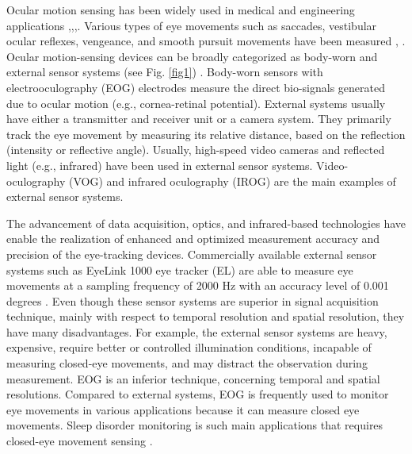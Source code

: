 \documentclass[transmag]{IEEEtran}
\begin{document}
Ocular motion sensing has been widely used in medical and engineering applications \cite{ref23},\cite{ref30},\cite{ref29},\cite{ref32}. Various types of eye movements such as saccades, vestibular ocular reflexes, vengeance, and smooth pursuit movements have been measured \cite{ref1}, \cite{ref25}. Ocular motion-sensing devices can be broadly categorized as body-worn and external sensor systems (see Fig. \ref{fig1}) \cite{ref2}. Body-worn sensors with electrooculography (EOG) electrodes measure the direct bio-signals generated due to ocular motion (e.g., cornea-retinal potential). External systems usually have either a transmitter and receiver unit or a camera system. They primarily track the eye movement by measuring its relative distance, based on the reflection (intensity or reflective angle). Usually, high-speed video cameras and reflected light (e.g., infrared) have been used in external sensor systems. Video-oculography (VOG) and infrared oculography (IROG) are the main examples of external sensor systems.

The advancement of data acquisition, optics, and infrared-based technologies have enable the realization of enhanced and optimized measurement accuracy and precision of the eye-tracking devices. Commercially available external sensor systems such as EyeLink 1000 eye tracker (EL) are able to measure eye movements at a sampling frequency of 2000 \si{\hertz} with an accuracy level of 0.001 degrees \cite{ref3}. Even though these sensor systems are superior in signal acquisition technique, mainly with respect to temporal resolution and spatial resolution, they have many disadvantages. For example, the external sensor systems are heavy, expensive, require better or controlled illumination conditions, incapable of measuring closed-eye movements, and may distract the observation during measurement. EOG is an inferior technique, concerning temporal and spatial resolutions. Compared to external systems, EOG is frequently used to monitor eye movements in various applications because it can measure closed eye movements. Sleep disorder monitoring is such main applications that requires closed-eye movement sensing \cite{ref23}.
\end{document}
